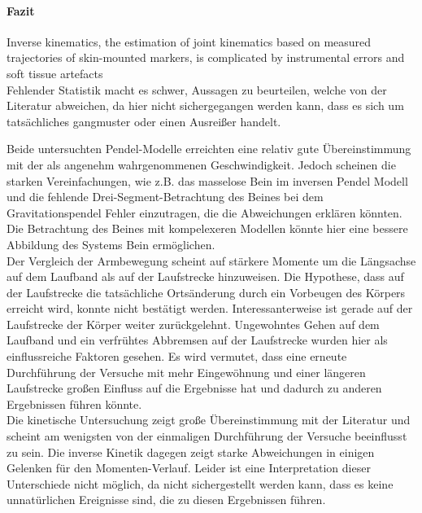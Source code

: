 \paragraph*{Fazit}
Inverse kinematics, the estimation of joint kinematics based on measured trajectories of skin-mounted markers, is complicated by instrumental errors and soft tissue artefacts \cite{groote2008kalman}\\

Fehlender Statistik macht es schwer, Aussagen zu beurteilen, welche von der Literatur abweichen, da hier nicht sichergegangen werden kann, dass es sich um tatsächliches gangmuster oder einen Ausreißer handelt. 

Beide untersuchten Pendel-Modelle erreichten eine relativ gute Übereinstimmung mit der als angenehm wahrgenommenen Geschwindigkeit. Jedoch scheinen die starken Vereinfachungen, wie z.B. das masselose Bein im inversen Pendel Modell und die fehlende Drei-Segment-Betrachtung des Beines bei dem Gravitationspendel Fehler einzutragen, die die Abweichungen erklären könnten. Die Betrachtung des Beines mit kompelexeren Modellen könnte hier eine bessere Abbildung des Systems Bein ermöglichen.\\
Der Vergleich der Armbewegung scheint auf stärkere Momente um die Längsachse auf dem Laufband als auf der Laufstrecke hinzuweisen. Die Hypothese, dass auf der Laufstrecke die tatsächliche Ortsänderung durch ein Vorbeugen des Körpers erreicht wird, konnte nicht bestätigt werden. Interessanterweise ist gerade auf der Laufstrecke der Körper weiter zurückgelehnt. Ungewohntes Gehen auf dem Laufband und ein verfrühtes Abbremsen auf der Laufstrecke wurden hier als einflussreiche Faktoren gesehen. Es wird vermutet, dass eine erneute Durchführung der Versuche mit mehr Eingewöhnung und einer längeren Laufstrecke großen Einfluss auf die Ergebnisse hat und dadurch zu anderen Ergebnissen führen könnte.\\
Die kinetische Untersuchung zeigt große Übereinstimmung mit der Literatur und scheint am wenigsten von der einmaligen Durchführung der Versuche beeinflusst zu sein. Die inverse Kinetik dagegen zeigt starke Abweichungen in einigen Gelenken für den Momenten-Verlauf. Leider ist eine Interpretation dieser Unterschiede nicht möglich, da nicht sichergestellt werden kann, dass es keine unnatürlichen Ereignisse sind, die zu diesen Ergebnissen führen.

